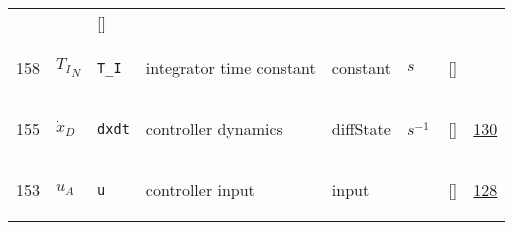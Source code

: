 \begin{longtable}{|p{1cm}|p{3cm}|p{3cm}|p{7cm}|p{3.0cm}|p{3cm}|p{2cm}|p{1cm}|}
             & $  $
             & []
             & \\
    158
             & \hypertarget{"v:158"}{ $ {T_I}_{N} $}
             & \verb|T_I|
             & integrator time constant
             & \begin{lay}constant \end{lay}
             & $ s \, $
             & []
             & \\
    155
             & \hypertarget{"v:155"}{ $ {\dot{x}}_{D} $}
             & \verb|dxdt|
             & controller dynamics
             & \begin{lay}diffState \end{lay}
             & $ s^{-1} \, $
             & []
             & \hyperlink{"e:130"}{ 130 }
                 \\
    153
             & \hypertarget{"v:153"}{ $ {u}_{A} $}
             & \verb|u|
             & controller input
             & \begin{lay}input \end{lay}
             & $  $
             & []
             & \hyperlink{"e:128"}{ 128 }
                 \\
    \end{longtable}
